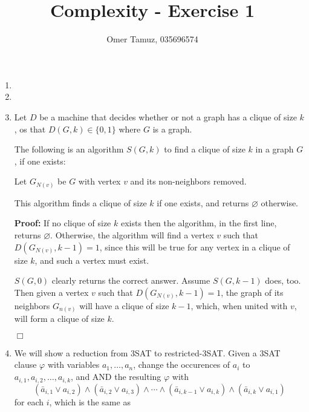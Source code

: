 \documentclass[11pt]{article} \usepackage{amssymb}
\newenvironment{proof}{\noindent \textbf{Proof:}}{$\Box$}
\renewcommand{\phi}{\varphi}
\begin{document}
\title{Complexity - Exercise 1}

 \author{Omer Tamuz, 035696574}
\maketitle


\begin{enumerate}
  \item
  \item
  \item
    
    Let $D$ be a machine that decides whether or not a graph has a clique
    of size $k$, os that $D(G,k)\in \{0,1\}$ where $G$ is a graph.

    The following is an algorithm $S(G,k)$ to find a clique of size $k$ in a 
    graph $G$, if one exists:

    
    Let $G_{N(v)}$ be $G$ with vertex $v$ and its non-neighbors removed. 
    \begin{algorithmic} 
      \ELSE
      \ENDIF
    \end{algorithmic}
    
    This algorithm finds a clique of size $k$ if one exists, and returns
    $\varnothing$ otherwise.

    \begin{proof}
      If no clique of size $k$ exists then the algorithm, in the first line, 
      returns $\varnothing$. 
      Otherwise, the algorithm will find a vertex $v$ such that 
      $D(G_{N(v)},k-1)=1$, since this will be true for any vertex in a clique
      of size $k$, and such a vertex must exist.
      
      $S(G,0)$ clearly returns the correct answer. Assume $S(G,k-1)$ does, too.
      Then given a vertex $v$ such that $D(G_{N(v)},k-1)=1$, the graph of its
      neighbors $G_{n(v)}$ will have a clique of size $k-1$, which, when
      united with $v$, will form a clique of size $k$.


    \end{proof}
  \item We will show a reduction from 3SAT to restricted-3SAT. Given a 3SAT
    clause $\phi$ with variables $a_1,\ldots,a_n$, change the occurences
    of $a_i$ to $a_{i,1},a_{i,2},\ldots,a_{i,k}$, and AND the resulting 
    $\phi$ with
    \begin{equation*}
    (\bar{a}_{i,1}\vee a_{i,2})\wedge(\bar{a}_{i,2}\vee a_{i,3})\wedge\cdots\wedge
(\bar{a}_{i,k-1}\vee a_{i,k})\wedge(\bar{a}_{i,k}\vee a_{i,1})  
    \end{equation*}
     for each $i$, which is the same as 


\end{enumerate}
\end{document}
